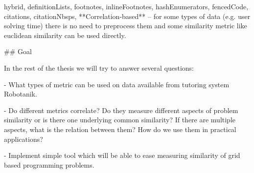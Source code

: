 \documentclass[
  digital, %
  table,   %
  nolof,     %
  nolot,     %
  nocover
]{fithesis3}
\begin{document}
\begin{markdown*}{%
  hybrid,
  definitionLists,
  footnotes,
  inlineFootnotes,
  hashEnumerators,
  fencedCode,
  citations,
  citationNbsps,
}
**Correlation-based** -- for some types of data (e.g. user solving time) there is no need to preprocess them and some similarity metric like euclidean similarity can be used directly.

## Goal

In the rest of the thesis we will try to answer several questions:

- What types of metric can be used on data available from tutoring system Robotanik.

- Do different metrics correlate? Do they measure different aspects of problem similarity or is there one underlying common similarity? If there are multiple aspects, what is the relation between them? How do we use them in practical applications?

- Implement simple tool which will be able to ease measuring similarity of grid based programming problems.

%
%

\iffalse %

# Robotanik

In this chapter we will talk more about things that are specific to Robotanik and data used in our analysis.

Most of the experiments were executed on data collected from programming environment Robotanik available at [tutor.fi.muni.cz](http://tutor.fi.muni.cz/). Robotanik is programming environment with 78 handcrafted problems for student to solve. Goal of the student is to write program for robot to traverse board and collect all flowers. Each problem has board filled with tiles of stones, colored tiles (green, red, brown) and flowers.

## Data

**Problem statements**

**Solutions**

**Performance data**

## Chosen metrics

In this thesis we are consider only some metrics. We will describe them in detail in this chapter.

### Problem statement

### Solutions

### Performance data


%
%

# Tool

## Tool capabilities

## Chosen metrics

## Evaluation

### Compare metrics

### Collecting crowd-truth

## Visualisations

\fi %

\end{markdown*}
\end{document}
